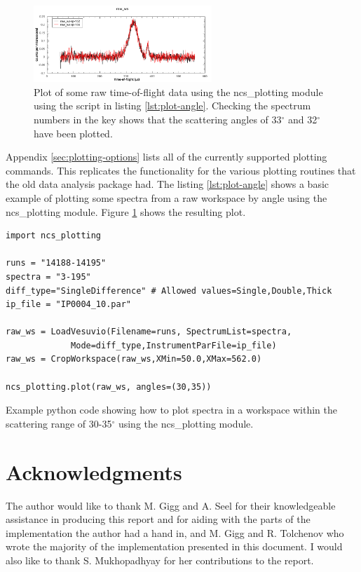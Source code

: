 \documentclass[paper=a4, fontsize=11pt]{scrartcl}	%
\numberwithin{equation}{section}															%
\numberwithin{figure}{section}																%
\numberwithin{table}{section}
\begin{document}
\begin{figure}[H]
\centering
\includegraphics[width=0.6\textwidth]{img/plot-angle.png}
\caption{Plot of some raw time-of-flight data using the ncs\_plotting module using the script in listing \ref{lst:plot-angle}. Checking the spectrum numbers in the key shows that the scattering angles of 33$^\circ$ and 32$^\circ$ have been plotted.}
\label{fig:plot-angle}
\end{figure}

Appendix \ref{sec:plotting-options} lists all of the currently supported plotting commands. This replicates the functionality for the various plotting routines that the old data analysis package had. The listing \ref{lst:plot-angle} shows a basic example of plotting some spectra from a raw workspace by angle using the ncs\_plotting module. Figure \ref{fig:plot-angle} shows the resulting plot.

\begin{listing}[H]
\begin{verbatim}
import ncs_plotting

runs = "14188-14195"
spectra = "3-195"
diff_type="SingleDifference" # Allowed values=Single,Double,Thick
ip_file = "IP0004_10.par"

raw_ws = LoadVesuvio(Filename=runs, SpectrumList=spectra,
		     Mode=diff_type,InstrumentParFile=ip_file)
raw_ws = CropWorkspace(raw_ws,XMin=50.0,XMax=562.0)

ncs_plotting.plot(raw_ws, angles=(30,35))
\end{verbatim}
\caption{Example python code showing how to plot spectra in a workspace within the scattering range of 30-35$^\circ$ using the ncs\_plotting module.}
\label{lst:plot-angle}
\end{listing}

\clearpage
\section*{Acknowledgments}
The author would like to thank M. Gigg and A. Seel for their knowledgeable assistance in producing this report and for aiding with the parts of the implementation the author had a hand in, and M. Gigg and R. Tolchenov who wrote the majority of the implementation presented in this document. I would also like to thank S. Mukhopadhyay for her contributions to the report.
\end{document}
